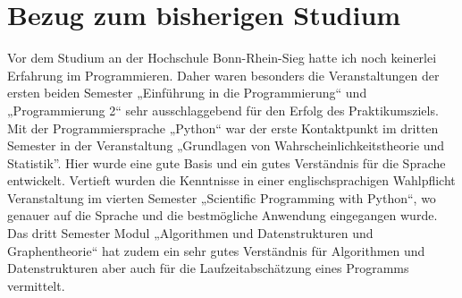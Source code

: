 \section{Bezug zum bisherigen Studium }\label{sec:bezug}
Vor dem Studium an der Hochschule Bonn-Rhein-Sieg hatte ich noch keinerlei Erfahrung im Programmieren. Daher waren besonders die Veranstaltungen der ersten beiden Semester „Einführung in die Programmierung“ und „Programmierung 2“ sehr ausschlaggebend für den Erfolg des Praktikumsziels. Mit der Programmiersprache „Python“ war der erste Kontaktpunkt im dritten Semester in der Veranstaltung „Grundlagen von Wahrscheinlichkeitstheorie und Statistik”. Hier wurde eine gute Basis und ein gutes Verständnis für die Sprache entwickelt. Vertieft wurden die Kenntnisse in einer englischsprachigen Wahlpflicht Veranstaltung im vierten Semester „Scientific Programming with Python“, wo genauer auf die Sprache und die bestmögliche Anwendung eingegangen wurde. Das dritt Semester Modul „Algorithmen und Datenstrukturen und Graphentheorie“ hat zudem ein sehr gutes Verständnis für Algorithmen und Datenstrukturen aber auch für die Laufzeitabschätzung eines Programms vermittelt.